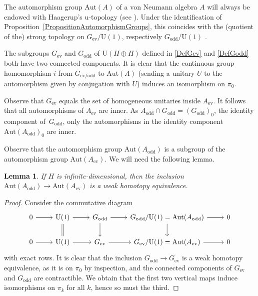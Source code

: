 \documentclass[10pt,a4paper]{amsart}
\numberwithin{equation}{section}
\newtheorem{Lemma}[Theorem]{Lemma}
\newcommand{\Aut}{\mathrm{Aut}}
\newcommand{\U}{\mathrm{U}}
\begin{document}
The automorphism group $\Aut(A)$ of a von Neumann algebra $A$ will always be endowed with Haagerup's u-topology (see \cite[Section~3]{HaagerupStandardForm}).
Under the identification of Proposition~\ref{PropositionAutomorphismGroups}, this coincides with the (quotient of the) strong topology on $G_{\mathrm{ev}}/\U(1)$, respectively $G_{\mathrm{odd}}/\U(1)$ \cite[Corollary~3.8]{HaagerupStandardForm}.

\begin{Remark} \label{RemarkComponentsAutA}
The subgroups $G_{\mathrm{ev}}$ and $G_{\mathrm{odd}}$ of $\U(H \oplus H)$ defined in \eqref{DefGev} and \eqref{DefGodd} both have two connected components.
It is clear that the continuous group homomorphism $i$ from $G_{\mathrm{ev}/\mathrm{odd}}$ to $\Aut(A)$ (sending a unitary $U$ to the automorphism given by conjugation with $U$) induces an isomorphism on $\pi_0$.
\end{Remark}

\begin{Remark}
Observe that $G_{\mathrm{ev}}$ equals the set of homogeneous unitaries inside $A_{\mathrm{ev}}$.
It follows that all automorphisms of $A_{\mathrm{ev}}$ are inner.
As $A_{\mathrm{odd}} \cap G_{\mathrm{odd}} = (G_{\mathrm{odd}})_0$, the identity component of~$G_{\mathrm{odd}}$, only the automorphisms in the identity component $\Aut(A_{\mathrm{odd}})_0$ are inner.
\end{Remark}

Observe that the automorphism group $\Aut(A_{\mathrm{odd}})$ is a subgroup of the automorphism group $\Aut(A_{\mathrm{ev}})$.
We will need the following lemma.

\begin{Lemma} \label{WeakHomotopyEquivalence}
If $H$ is infinite-dimensional, then the inclusion $\Aut(A_{\mathrm{odd}}) \to \Aut(A_{\mathrm{ev}})$ is a weak homotopy equivalence.
\end{Lemma}

\begin{proof}
Consider the commutative diagram
\begin{equation*}
\begin{tikzcd}
 0 \ar[r] & \U(1) \ar[r] \ar[d, equal] & G_{\mathrm{odd}} \ar[d] \ar[r] & G_{\mathrm{odd}}/\U(1) = \Aut(A_{\mathrm{odd}})\ar[r] \ar[d] & 0 \\
 0 \ar[r] & \U(1) \ar[r] & G_{\mathrm{ev}} \ar[r] & G_{\mathrm{ev}}/\U(1) = \Aut(A_{\mathrm{ev}}) \ar[r] & 0
\end{tikzcd}
\end{equation*}
with exact rows.
It is clear that the inclusion $G_{\mathrm{odd}} \to G_{\mathrm{ev}}$ is a weak homotopy equivalence, as it is on $\pi_0$ by inspection, and the connected components of $G_{\mathrm{ev}}$ and $G_{\mathrm{odd}}$ are contractible.
We obtain that the first two vertical maps induce isomorphisms on $\pi_k$ for all $k$, hence so must the third.
\end{proof}
\end{document}

